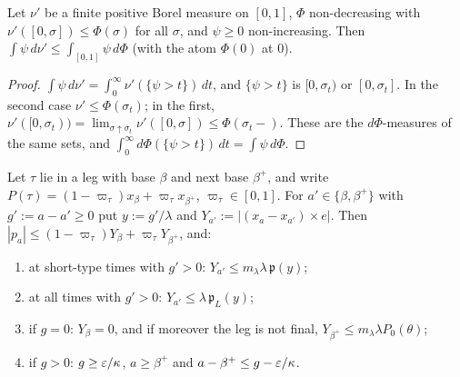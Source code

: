 \begin{lemma}\label{lem:Nl}
Let $\nu'$ be a finite positive Borel measure on $[0,1]$, $\Phi$ non-decreasing with $\nu'([0,\sigma])\le\Phi(\sigma)$ for all $\sigma$, and
$\psi\ge0$ non-increasing. Then $\int\psi\,d\nu'\le\int_{[0,1]}\psi\,d\Phi$ \textup(with the atom $\Phi(0)$ at $0$\textup).
\end{lemma}

\begin{proof}
$\int\psi\,d\nu'=\int_0^\infty\nu'(\{\psi>t\})\,dt$, and $\{\psi>t\}$ is $[0,\sigma_t)$ or $[0,\sigma_t]$. In the second case
$\nu'\le\Phi(\sigma_t)$; in the first, $\nu'([0,\sigma_t))=\lim_{\sigma\uparrow\sigma_t}\nu'([0,\sigma])\le\Phi(\sigma_t-)$. These are the
$d\Phi$-measures of the same sets, and $\int_0^\infty d\Phi(\{\psi>t\})\,dt=\int\psi\,d\Phi$.
\end{proof}

\begin{lemma}[offsets]\label{lem:No}
Let $\tau$ lie in a leg with base $\beta$ and next base $\beta^+$, and write $P(\tau)=(1-\varpi_\tau)x_\beta+\varpi_\tau x_{\beta^+}$,
$\varpi_\tau\in[0,1]$. For $a'\in\{\beta,\beta^+\}$ with $g':=a-a'\ge0$ put $y:=g'/\lambda$ and $Y_{a'}:=|(x_a-x_{a'})\times e|$. Then
$|p_a|\le(1-\varpi_\tau)Y_\beta+\varpi_\tau Y_{\beta^+}$, and:
\begin{enumerate}
\item[(i)] at short-type times with $g'>0$: $Y_{a'}\le m_\lambda\lambda\,\mathfrak p(y)$;
\item[(ii)] at all times with $g'>0$: $Y_{a'}\le\lambda\,\mathfrak p_L(y)$;
\item[(iii)] if $g=0$: $Y_\beta=0$, and if moreover the leg is not final, $Y_{\beta^+}\le m_\lambda\lambda P_0(\theta)$;
\item[(iv)] if $g>0$: $g\ge\varepsilon/\kappa$, $a\ge\beta^+$ and $a-\beta^+\le g-\varepsilon/\kappa$.
\end{enumerate}
\end{lemma}

